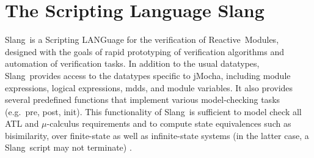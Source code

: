 \documentclass[10pt,twocolumn]{article}
\def\jmocha{{\small\sc jMocha}}
\def\slang{{\small\sc Slang}}
\def\md{P}
\def\expr{\phi}
\def\mdd{{\sc mdd}}
\def\bdd{\Phi}
\newcommand{\rem}{\mbox{\small\sc Reactive Modules}}
\begin{document}
\section{The Scripting Language \slang}
\label{sec:Slang}

\slang\ is a Scripting LANGuage for the verification of \rem,
designed with the goals of rapid prototyping of verification algorithms and
automation of verification tasks.  
%
In addition to the usual
datatypes, 
\slang\ provides access to
the datatypes specific to \jmocha, including module expressions, logical
expressions, 
{\mdd}s, and module variables.  
It also provides several predefined functions
that implement various model-checking tasks (e.g.~pre, post, init).
%
This functionality of
\slang\ is
sufficient to model check all ATL and $\mu$-calculus requirements and 
to compute state equivalences such as bisimilarity, over finite-state as 
well as infinite-state systems (in the latter case, a \slang{}ript may 
not terminate) \cite{STACS00}.
\end{document}
